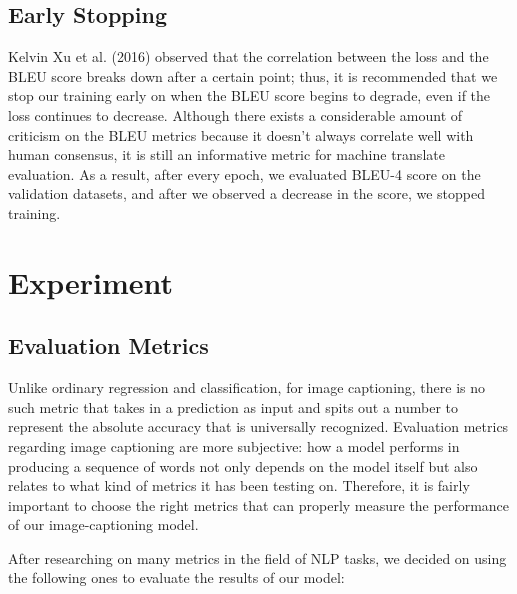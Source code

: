\documentclass{article}
\begin{document}
\subsection{Early Stopping}

Kelvin Xu et al. (2016) observed that the correlation between the loss and the BLEU score breaks down after a certain point; thus, it is recommended that we stop our training early on when the BLEU score begins to degrade, even if the loss continues to decrease. Although there exists a considerable amount of criticism on the BLEU metrics because it doesn’t always correlate well with human consensus, it is still an informative metric for machine translate evaluation. As a result, after every epoch, we evaluated BLEU-4 score on the validation datasets, and after we observed a decrease in the score, we stopped training.


\section{Experiment}

\subsection{Evaluation Metrics}

Unlike ordinary regression and classification, for image captioning, there is no such metric that takes in a prediction as input and spits out a number to represent the absolute accuracy that is universally recognized. Evaluation metrics regarding image captioning are more subjective: how a model performs in producing a sequence of words not only depends on the model itself but also relates to what kind of metrics it has been testing on. Therefore, it is fairly important to choose the right metrics that can properly measure the performance of our image-captioning model.

After researching on many metrics in the field of NLP tasks, we decided on using the following ones to evaluate the results of our model:
\end{document}

